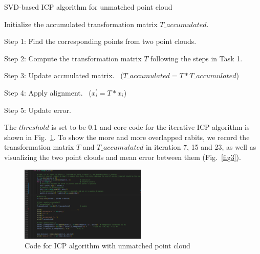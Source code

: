 \documentclass[hyperref]{article}
\theoremstyle{nonumberplain}
\begin{document}
\begin{algorithm}
	\caption{SVD-based ICP algorithm for unmatched point cloud}
	\begin{algorithmic}  
		\STATE Initialize the accumulated transformation matrix $T\_accumulated$.
		
		\STATE Step 1: Find the corresponding points from two point clouds.
		
		\STATE Step 2: Compute the transformation matrix $T$ following the steps in Task 1.
		
		\STATE Step 3: Update accmulated matrix. \ ($T\_accumulated=T*T\_accumulated$)
		
		\STATE Step 4: Apply alignment. \ ($x_{i}^{'}=T*x_{i}$)
		
		\STATE Step 5: Update error.
		
		\ENDWHILE
		
	\end{algorithmic}
	\label{alg:algorithm1} 
\end{algorithm}

The $threshold$ is set to be 0.1 and core code for the iterative ICP algorithm is shown in Fig.~\ref{fig2}. To show the more and more overlapped rabits, we record the transformation matrix $T$ and $T\_accumulated$ in iteration 7, 15 and 23, as well as visualizing the two point clouds and mean error between them (Fig.~\ref{fig3}). 

\begin{figure}[H]
	\centering
		\includegraphics[width=6cm]{2_code.png}
	\caption{Code for ICP algorithm with unmatched point cloud}
	\label{fig2}
\end{figure} 
\end{document}
